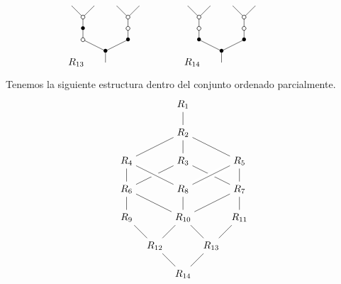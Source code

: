 \documentclass[../main.tex]{subfiles}
\begin{document}
\begin{ex}
    $$
        \xy
        <0.08cm, 0cm>:
        (0.0, 0.0)*{}="1"; %
        (0.0, 5.0)*=0{\bullet}="2"; %
        (-10.0, 10.0)*\cir<2pt>{}="3"; %
        (-10.0, 15.0)*=0{\bullet}="4"; %
        (-10.0, 20.0)*\cir<2pt>{}="5"; %
        (-15.0, 25.0)*{}="6"; %
        (-5.0, 25.0)*{}="7"; %
        (10.0, 10.0)*=0{\bullet}="8"; %
        (10.0, 15.0)*\cir<2pt>{}="9"; %
        (10.0, 20.0)*\cir<2pt>{}="10"; %
        (5.0, 25.0)*{}="11"; %
        (15.0, 25.0)*{}="12"; %
        "1";"2" **\dir{-};
        "2";"3" **\dir{-};
        "3";"4" **\dir{-};
        "4";"5" **\dir{-};
        "5";"6" **\dir{-};
        "5";"7" **\dir{-};
        "2";"8" **\dir{-};
        "8";"9" **\dir{-};
        "9";"10" **\dir{-};
        "10";"11" **\dir{-};
        "10";"12" **\dir{-};
        (-13,0)*{R_{13}};
        \endxy
        \xy
        <0.08cm, 0cm>:
        (-10, 0.0)*{}="1";
        (10, 10.0)*{}="2";
        \endxy
        \xy
        <0.08cm, 0cm>:
        (0.0, 0.0)*{}="1"; %
        (0.0, 5.0)*=0{\bullet}="2"; %
        (-10.0, 10.0)*=0{\bullet}="3"; %
        (-10.0, 15.0)*\cir<2pt>{}="4"; %
        (-10.0, 20.0)*\cir<2pt>{}="5"; %
        (-15.0, 25.0)*{}="6"; %
        (-5.0, 25.0)*{}="7"; %
        (10.0, 10.0)*=0{\bullet}="8"; %
        (10.0, 15.0)*\cir<2pt>{}="9"; %
        (10.0, 20.0)*\cir<2pt>{}="10"; %
        (5.0, 25.0)*{}="11"; %
        (15.0, 25.0)*{}="12"; %
        "1";"2" **\dir{-};
        "2";"3" **\dir{-};
        "3";"4" **\dir{-};
        "4";"5" **\dir{-};
        "5";"6" **\dir{-};
        "5";"7" **\dir{-};
        "2";"8" **\dir{-};
        "8";"9" **\dir{-};
        "9";"10" **\dir{-};
        "10";"11" **\dir{-};
        "10";"12" **\dir{-};
        (-13,0)*{R_{14}};
        \endxy
        \xy
        <0.08cm, 0cm>:
        (-10, 0.0)*{}="1";
        (10, 10.0)*{}="2";
        \endxy
    $$

    Tenemos la siguiente estructura dentro del conjunto ordenado parcialmente.
    $$
        \begin{tikzpicture}
            \node (max) at (0,0) {$R_{14}$};
            \node (12) at (-1,1) {$R_{12}$};
            \node (13) at (1,1) {$R_{13}$};
            \node (9) at (-2,2) {$R_{9}$};
            \node (10) at (0,2) {$R_{10}$};
            \node (11) at (2,2) {$R_{11}$};
            \node (6) at (-2,3) {$R_{6}$};
            \node (8) at (0,3) {$R_{8}$};
            \node (7) at (2,3) {$R_{7}$};
            \node (4) at (-2,4) {$R_{4}$};
            \node (3) at (0,4) {$R_{3}$};
            \node (5) at (2,4) {$R_{5}$};
            \node (2) at (0,5) {$R_{2}$};
            \node (min) at (0,6) {$R_{1}$};
            \draw (min) -- (2) -- (4) -- (6) -- (9) -- (12) -- (max)
            (2) -- (5) -- (7) -- (11) -- (13) -- (max)
            (2) -- (3) -- (6) -- (10) -- (12)
            (3) -- (7) -- (10) -- (13)
            (8) -- (10);
            \draw[preaction={draw=white, -,line width=6pt}] (4) -- (8) -- (5);
        \end{tikzpicture}
    $$
\end{ex}
\end{document}

